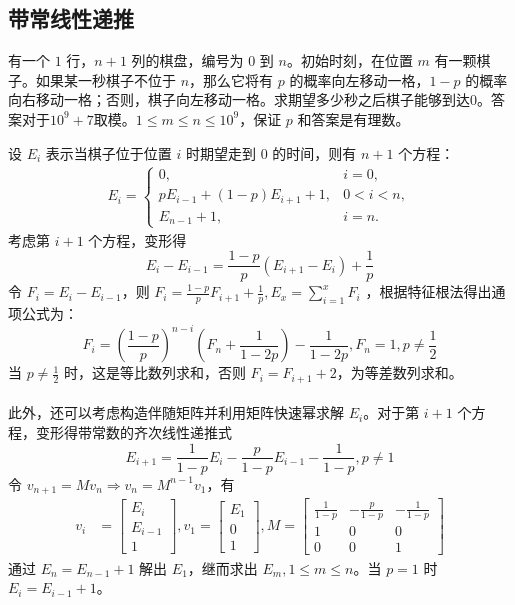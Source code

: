 \documentclass[12pt,a4paper]{article}
\begin{document}
\subsection{带常线性递推}
\begin{mdframed}[leftline=true, linewidth=2pt, linecolor=gray]
	有一个 $1$ 行，$n+1$ 列的棋盘，编号为 $0$ 到 $n$。初始时刻，在位置 $m$ 有一颗棋子。如果某一秒棋子不位于 $n$，那么它将有 $p$ 的概率向左移动一格，$1-p$ 的概率向右移动一格；否则，棋子向左移动一格。求期望多少秒之后棋子能够到达$0$。答案对于$10^9+7$取模。$1\le m\le n\le 10^9$，保证 $p$ 和答案是有理数。
\end{mdframed}
设 $E_i$ 表示当棋子位于位置 $i$ 时期望走到 $0$ 的时间，则有 $n+1$ 个方程：
\begin{align*}
	E_i = 
	\begin{cases}
		0, & i = 0, \\[6pt]
		pE_{i-1}+(1-p)E_{i+1}+1, & 0 < i < n, \\[6pt]
		E_{n-1}+1, & i = n.
	\end{cases}
\end{align*}
考虑第 $i+1$ 个方程，变形得 
\begin{equation*}
	\displaystyle E_i-E_{i-1}=\frac{1-p}{p}(E_{i+1}-E_i)+\frac{1}{p}
\end{equation*}
令 $F_i=E_i-E_{i-1}$，则 $\displaystyle F_i=\frac{1-p}{p}F_{i+1}+\frac{1}{p}, E_x=\sum_{i=1}^{x}F_i$ ，根据特征根法得出通项公式为： 
\begin{equation*}
	\displaystyle F_i=(\frac{1-p}{p})^{n-i}(F_n+\frac{1}{1-2p})-\frac{1}{1-2p} , F_n=1,p\ne\frac{1}{2}
\end{equation*}
当 $\displaystyle p\ne\frac{1}{2}$ 时，这是等比数列求和，否则 $F_i=F_{i+1}+2$，为等差数列求和。\\\\
此外，还可以考虑构造伴随矩阵并利用矩阵快速幂求解 $E_i$。对于第 $i+1$ 个方程，变形得带常数的齐次线性递推式 \begin{equation*}
	\displaystyle E_{i+1}=\frac{1}{1-p}E_{i}-\frac{p}{1-p}E_{i-1}-\frac{1}{1-p},p\ne1
\end{equation*}
令 $v_{n+1}=Mv_n\Rightarrow v_n=M^{n-1}v_1$，有
\begin{align*}
	\displaystyle v_i&=\begin{bmatrix}E_i\\E_{i-1}\\1\end{bmatrix},v_1=\begin{bmatrix}E_1\\0\\1\end{bmatrix},M=\begin{bmatrix}\frac{1}{1-p} & -\frac{p}{1-p} & -\frac{1}{1-p}\\1 & 0 & 0\\0 & 0 & 1\end{bmatrix}
\end{align*}
通过 $E_n=E_{n-1}+1$ 解出 $E_1$，继而求出 $E_m,1\le m\le n$。当 $p=1$ 时 $E_i=E_{i-1}+1$。
\end{document}
